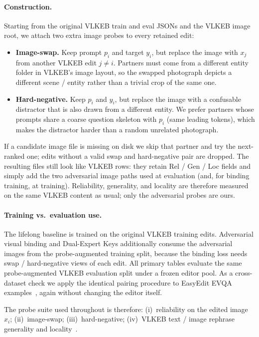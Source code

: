 \documentclass[letterpaper]{article} %
\begin{document}
\paragraph{Construction.}
Starting from the original VLKEB train and eval JSONs and the VLKEB image root, we attach two extra image probes to every retained edit:
\begin{itemize}
\item \textbf{Image-swap.} Keep prompt $p_i$ and target $y_i$, but replace the image with $x_j$ from another VLKEB edit $j\neq i$.
Partners must come from a different entity folder in VLKEB's image layout, so the swapped photograph depicts a different scene / entity rather than a trivial crop of the same one.
\item \textbf{Hard-negative.} Keep $p_i$ and $y_i$, but replace the image with a confusable distractor that is also drawn from a different entity.
We prefer partners whose prompts share a coarse question skeleton with $p_i$ (same leading tokens), which makes the distractor harder than a random unrelated photograph.
\end{itemize}
If a candidate image file is missing on disk we skip that partner and try the next-ranked one; edits without a valid swap and hard-negative pair are dropped.
The resulting files still look like VLKEB rows: they retain Rel / Gen / Loc fields and simply add the two adversarial image paths used at evaluation (and, for binding training, at training).
Reliability, generality, and locality are therefore measured on the same VLKEB content as usual; only the adversarial probes are ours.

\paragraph{Training vs.\ evaluation use.}
The lifelong baseline is trained on the original VLKEB training edits.
Adversarial visual binding and Dual-Expert Keys additionally consume the adversarial images from the probe-augmented training split, because the binding loss needs swap / hard-negative views of each edit.
All primary tables evaluate the same probe-augmented VLKEB evaluation split under a frozen editor pool.
As a cross-dataset check we apply the identical pairing procedure to EasyEdit EVQA examples~\cite{wang2024easyedit}, again without changing the editor itself.

The probe suite used throughout is therefore:
(i)~reliability on the edited image $x_i$;
(ii)~image-swap;
(iii)~hard-negative;
(iv)~VLKEB text / image rephrase generality and locality~\cite{huang2024vlkeb,chen2025liveedit}.
\end{document}
